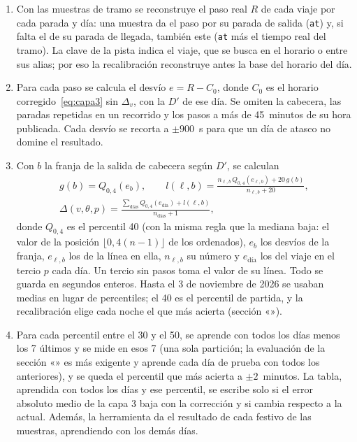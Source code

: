 \begin{enumerate}
  \item Con las muestras de tramo se reconstruye el paso real $R$ de cada viaje por cada parada y día: una muestra da
        el paso por su parada de salida (\texttt{at}) y, si falta el de su parada de llegada, también este (\texttt{at}
        más el tiempo real del tramo). La clave de la pista indica el viaje, que se busca en el horario o entre sus
        alias; por eso la recalibración reconstruye antes la base del horario del día.
  \item Para cada paso se calcula el desvío $e=R-C_0$, donde $C_0$ es el horario corregido~\eqref{eq:capa3} sin
        $\Delta_v$, con la $D'$ de ese día. Se omiten la cabecera, las paradas repetidas en un recorrido y los pasos a
        más de 45~minutos de su hora publicada. Cada desvío se recorta a $\pm900$~s para que un día de atasco no
        domine el resultado.
  \item Con $b$ la franja de la salida de cabecera según $D'$, se calculan
        \begin{equation}
        \label{eq:correccion-tablas}
        \begin{gathered}
        g(b)=Q_{0{,}4}(e_b),\qquad
        l(\ell,b)=\frac{n_{\ell,b}\,Q_{0{,}4}(e_{\ell,b})+20\,g(b)}{n_{\ell,b}+20},\\
        \Delta(v,\theta,p)=\frac{\sum_{\text{días}}Q_{0{,}4}(e_{\text{día}})+l(\ell,b)}{n_{\text{días}}+1},
        \end{gathered}
        \end{equation}
        donde $Q_{0{,}4}$ es el percentil 40 (con la misma regla que la mediana baja: el valor de la posición
        $\lfloor0{,}4(n-1)\rfloor$ de los ordenados), $e_b$ los desvíos de la franja, $e_{\ell,b}$ los de la línea en
        ella, $n_{\ell,b}$ su número y $e_{\text{día}}$ los del viaje en el tercio $p$ cada día. Un tercio sin pasos toma
        el valor de su línea. Todo se guarda en segundos enteros. Hasta el 3 de noviembre de 2026 se usaban medias en
        lugar de percentiles; el 40 es el percentil de partida, y la recalibración elige cada noche el que más acierta
        (sección «»).
  \item Para cada percentil entre el 30 y el 50, se aprende con todos los días menos los 7 últimos y se mide en esos 7
        (una sola partición; la evaluación de la sección «» es más exigente y aprende cada
        día de prueba con todos los anteriores), y se queda el percentil que más acierta a $\pm2$~minutos. La tabla,
        aprendida con todos los días y ese percentil, se escribe solo si el error absoluto medio de la capa 3 baja con
        la corrección y si cambia respecto a la actual. Además, la herramienta da el resultado de cada festivo de las
        muestras, aprendiendo con los demás días.
\end{enumerate}

